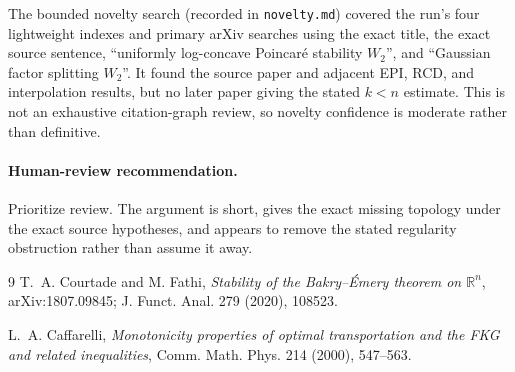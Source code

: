 \documentclass[11pt]{article}
\newcommand{\R}{\mathbb R}
\begin{document}
The bounded novelty search (recorded in \texttt{novelty.md}) covered the run's
four lightweight indexes and primary arXiv searches using the exact title,
the exact source sentence, ``uniformly log-concave Poincar\'e stability
$W_2$'', and ``Gaussian factor splitting $W_2$''.  It found the source paper
and adjacent EPI, RCD, and interpolation results, but no later paper giving the
stated $k<n$ estimate.  This is not an exhaustive citation-graph review, so
novelty confidence is moderate rather than definitive.

\paragraph{Human-review recommendation.}
Prioritize review.  The argument is short, gives the exact missing topology
under the exact source hypotheses, and appears to remove the stated
regularity obstruction rather than assume it away.

\begin{thebibliography}{9}
T.~A. Courtade and M. Fathi,
\emph{Stability of the Bakry--\'Emery theorem on $\R^n$},
arXiv:1807.09845; J. Funct. Anal. 279 (2020), 108523.

L.~A. Caffarelli,
\emph{Monotonicity properties of optimal transportation and the FKG and
related inequalities},
Comm. Math. Phys. 214 (2000), 547--563.
\end{thebibliography}
\end{document}
